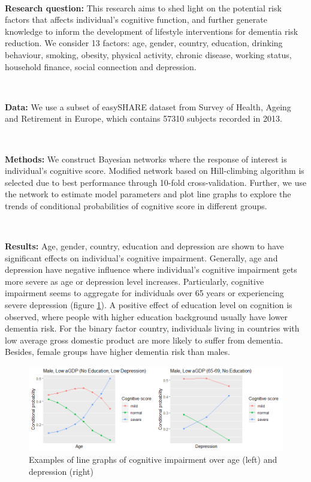 \documentclass[11pt,twoside]{article}
\numberwithin{Theorem}{section}
\numberwithin{Definition}{section}
\numberwithin{Lemma}{section}
\numberwithin{Algorithm}{section}
\numberwithin{equation}{section}
\begin{document}
\

\textbf{Research question:} This research aims to shed light on the potential risk factors that affects individual's cognitive function, and further generate knowledge to inform the development of lifestyle interventions for dementia risk reduction. We consider 13 factors: age, gender, country, education, drinking behaviour, smoking, obesity, physical activity, chronic disease, working status, household finance, social connection and depression.

\

\textbf{Data:} We use a subset of easySHARE dataset from Survey of Health, Ageing and Retirement in Europe, which contains 57310 subjects recorded in 2013.

\

\textbf{Methods:} We construct Bayesian networks where the response of interest is individual's cognitive score. Modified network based on Hill-climbing algorithm is selected due to best performance through 10-fold cross-validation. Further, we use the network to estimate model parameters and plot line graphs to explore the trends of conditional probabilities of cognitive score in different groups.

\

\textbf{Results:} Age, gender, country, education and depression are shown to have significant effects on individual's cognitive impairment. Generally, age and depression have negative influence where individual's cognitive impairment gets more severe as age or depression level increases. Particularly, cognitive impairment seems to aggregate for individuals over 65 years or experiencing severe depression (figure \ref{summary}). A positive effect of education level on cognition is observed, where people with higher education background usually have lower dementia risk. For the binary factor country, individuals living in countries with low average gross domestic product are more likely to suffer from dementia. Besides, female groups have higher dementia risk than males.

\begin{figure}[!h]
	\centering
	\includegraphics[width = \textwidth]{Images/summary.png}
	\caption{Examples of line graphs of cognitive impairment over age (left) and depression (right)}
	\label{summary}
\end{figure}
\end{document}
